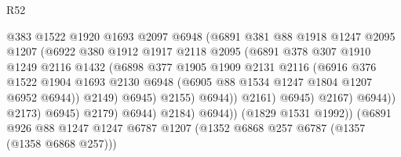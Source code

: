 \begin{lexlean}{R52}
\begin{coremodule}
                                    @383
                                    @1522
                                    @1920
                                    @1693
                                    @2097
                                    @6948
                                    (@6891
                                      @381
                                      @88
                                      @1918
                                      @1247
                                      @2095
                                      @1207
                                      (@6922
                                        @380
                                        @1912
                                        @1917
                                        @2118
                                        @2095
                                        (@6891
                                          @378
                                          @307
                                          @1910
                                          @1249
                                          @2116
                                          @1432
                                          (@6898
                                            @377
                                            @1905
                                            @1909
                                            @2131
                                            @2116
                                            (@6916
                                              @376
                                              @1522
                                              @1904
                                              @1693
                                              @2130
                                              @6948
                                              (@6905 @88 @1534 @1247 @1804 @1207 @6952 @6944))
                                            @2149)
                                          @6945)
                                        @2155)
                                      @6944))
                                  @2161)
                                @6945)
                              @2167)
                            @6944))
                        @2173)
                      @6945)
                    @2179)
                  @6944)
                @2184)
              @6944))
          (@1829 @1531 @1992))
        (@6891
          @926
          @88
          @1247
          @1247
          @6787
          @1207
          (@1352 @6868 @257 @6787 (@1357 (@1358 @6868 @257)))

\end{coremodule}
\end{lexlean}

